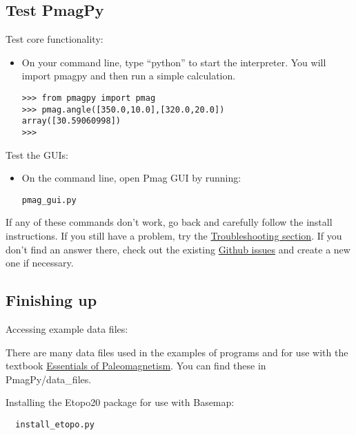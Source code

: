 \documentclass[11pt]{article}
\begin{document}
\subsection{Test PmagPy}

Test core functionality:

\begin{itemize}
  \item On your command line, type ``python'' to start the interpreter.  You will import pmagpy and then run a simple calculation.

\begin{verbatim}
>>> from pmagpy import pmag
>>> pmag.angle([350.0,10.0],[320.0,20.0])
array([30.59060998])
>>>
\end{verbatim}

\end{itemize}

Test the GUIs:

\begin{itemize}
\item  On the command line, open Pmag GUI by running:

\begin{verbatim}
pmag_gui.py
\end{verbatim}

\end{itemize}

If any of these commands don't work, go back and carefully follow the install instructions.  If you still have a problem, try the \href{https://earthref.org/PmagPy/cookbook/#trouble}{Troubleshooting section}.  If you don't find an answer there, check out the existing \href{https://github.com/PmagPy/PmagPy/issues}{Github issues} and create a new one if necessary.

\subsection{Finishing up}

Accessing example data files:

   There are many data files used in the examples of programs and for use with the textbook  \href{http://earthref.org/MAGIC/books/Tauxe/Essentials/WebBook3.html}{Essentials of Paleomagnetism}.  You can find these in PmagPy/data_files.

Installing the Etopo20 package for use with Basemap:

\begin{verbatim}
  install_etopo.py
\end{verbatim}
\end{document}
